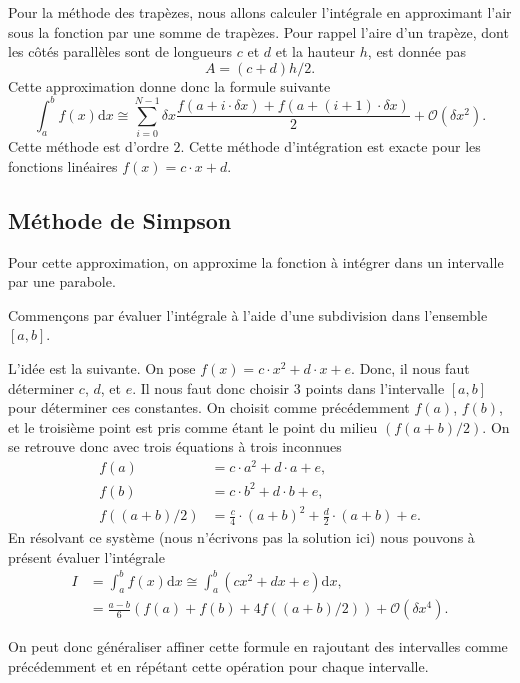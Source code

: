 \documentclass[a4paper,12pt]{book}
\newcommand{\dd}{\mathrm{d}}
\begin{document}
Pour la méthode des trapèzes, nous allons calculer l'intégrale en approximant l'air sous la fonction par une somme de trapèzes.
Pour rappel l'aire d'un trapèze, dont les côtés parallèles sont de longueurs $c$ et $d$ et la hauteur $h$, est donnée pas
\begin{equation}
 A=(c+d)h/2. 
\end{equation}
Cette approximation donne donc la formule suivante
\begin{equation}
 \int_a^bf(x)\dd x\cong\sum_{i=0}^{N-1} \delta x \frac{f(a+i\cdot\delta x)+f(a+(i+1)\cdot\delta x)}{2}+\mathcal{O}(\delta x^2).
\end{equation}
Cette méthode est d'ordre $2$. Cette méthode d'intégration est exacte pour les fonctions linéaires $f(x)=c\cdot x + d$.

\subsection{Méthode de Simpson}

Pour cette approximation, on approxime la fonction à intégrer dans un intervalle par une parabole.

Commençons par évaluer l'intégrale à l'aide d'une subdivision dans l'ensemble $[a,b]$.

L'idée est la suivante. On pose $f(x)=c\cdot x^2+d\cdot x+e$. Donc, il nous faut déterminer $c$, $d$, et $e$.
Il nous faut donc choisir 3 points dans l'intervalle $[a,b]$ pour déterminer ces constantes.
On choisit comme précédemment $f(a)$, $f(b)$, et le troisième point est pris comme étant le point du milieu
$(f(a+b)/2)$. On se retrouve donc avec trois équations à trois inconnues
\begin{align}
 f(a)&=c\cdot a^2+d\cdot a+e,\\
 f(b)&=c\cdot b^2+d\cdot b+e,\\
 f((a+b)/2)&=\frac{c}{4}\cdot (a+b)^2+\frac{d}{2}\cdot (a+b)+e.
\end{align}
En résolvant ce système (nous n'écrivons pas la solution ici) nous pouvons à présent évaluer 
l'intégrale 
\begin{align}
 I&=\int_a^b f(x)\dd x\cong\int_a^b (cx^2+dx+e)\dd x,\nonumber\\
 &=\frac{a-b}{6}(f(a)+f(b)+4f((a+b)/2))+\mathcal{O}(\delta x^4).
\end{align}

On peut donc généraliser affiner cette formule en rajoutant des intervalles comme précédemment
et en répétant cette opération pour chaque intervalle.
\end{document}
